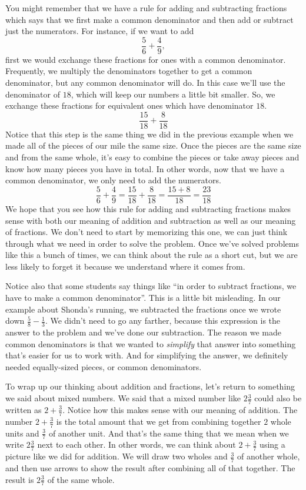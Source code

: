 \documentclass{ximera}
\begin{document}
You might remember that we have a rule for adding and subtracting fractions which says that we first make a common denominator and then add or subtract just the numerators. For instance, if we want to add
\[
\frac{5}{6} + \frac{4}{9}, 
\]
first we would exchange these fractions for ones with a common denominator. Frequently, we multiply the denominators together to get a common denominator, but any common denominator will do. In this case we'll use the denominator of $18$, which will keep our numbers a little bit smaller. So, we exchange these fractions for equivalent ones which have denominator $18$.
\[
\frac{15}{18} + \frac{8}{18}
\]
Notice that this step is the same thing we did in the previous example when we made all of the pieces of our mile the same size. Once the pieces are the same size and from the same whole, it's easy to combine the pieces or take away pieces and know how many pieces you have in total. In other words, now that we have a common denominator, we only need to add the numerators.
\[
\frac{5}{6} + \frac{4}{9} = \frac{15}{18} + \frac{8}{18} = \frac{15+8}{18} = \frac{23}{18}
\]
We hope that you see how this rule for adding and subtracting fractions makes sense with both our meaning of addition and subtraction as well as our meaning of fractions. We don't need to start by memorizing this one, we can just think through what we need in order to solve the problem. Once we've solved problems like this a bunch of times, we can think about the rule as a short cut, but we are less likely to forget it because we understand where it comes from.

Notice also that some students say things like ``in order to subtract fractions, we have to make a common denominator''. This is a little bit misleading. In our example about Shonda's running, we subtracted the fractions once we wrote down $\frac{5}{8} - \frac{1}{3}$. We didn't need to go any farther, because this expression is the answer to the problem and we've done our subtraction. The reason we made common denominators is that we wanted to \emph{simplify} that answer into something that's easier for us to work with. And for simplifying the answer, we definitely needed equally-sized pieces, or common denominators.


To wrap up our thinking about addition and fractions, let's return to something we said about mixed numbers. We said that a mixed number like $2 \frac{3}{7}$ could also be written as $2 + \frac{3}{7}$. Notice how this makes sense with our meaning of addition. The number $2 + \frac{3}{7}$ is the total amount that we get from combining together $2$ whole units and $\frac{3}{7}$ of another unit. And that's the same thing that we mean when we write $2 \frac{3}{7}$ next to each other. In other words, we can think about $2 + \frac{3}{7}$ using a picture like we did for addition. We will draw two wholes and $\frac{3}{7}$ of another whole, and then use arrows to show the result after combining all of that together. The result is $2 \frac{3}{7}$ of the same whole.
\end{document}
